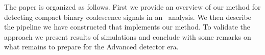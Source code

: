 The paper is organized as follows. First we provide an overview of our method
for detecting compact binary coalescence signals in an \earlywarning\
analysis. We then describe the pipeline we have constructed that implements
our method.  To validate the approach we present results of simulations and
conclude with some remarks on what remains to prepare for the Advanced
detector era.

